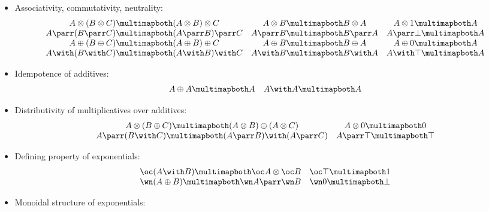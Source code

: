 \begin{itemize}
\item
  Associativity, commutativity, neutrality:
  \begin{equation*}
    \begin{array}{ccc}
    A \tens (B \tens C) \linequiv (A \tens B) \tens C & A \tens B \linequiv B \tens A & A \tens \one \linequiv A \\
    A \parr (B \parr C) \linequiv (A \parr B) \parr C & A \parr B \linequiv B \parr A & A \parr \bot \linequiv A \\
    A \plus (B \plus C) \linequiv (A \plus B) \plus C & A \plus B \linequiv B \plus A & A \plus \zero \linequiv A \\
A \with (B \with C) \linequiv (A \with B) \with C & A \with B \linequiv B \with A & A \with \top \linequiv A
    \end{array}
  \end{equation*}
\item
  Idempotence of additives:
  \begin{equation*}
    \begin{array}{cc}
      A \plus A \linequiv A & A \with A \linequiv A
    \end{array}
  \end{equation*}
\item
  Distributivity of multiplicatives over additives:
  \begin{equation*}
    \begin{array}{cc}
       A \tens (B \plus C) \linequiv (A \tens B) \plus (A \tens C) & A \tens \zero \linequiv \zero \\
       A \parr (B \with C) \linequiv (A \parr B) \with (A \parr C) & A \parr \top \linequiv \top
    \end{array}
  \end{equation*}
\item
  Defining property of exponentials:
  \begin{equation*}
    \begin{array}{cc}
       \oc(A \with B) \linequiv \oc A \tens \oc B & \oc\top \linequiv \one \\
       \wn(A \plus B) \linequiv \wn A \parr \wn B & \wn\zero \linequiv \bot
    \end{array}
  \end{equation*}
\item
  Monoidal structure of exponentials:
  \begin{equation*}
    \begin{array}{cc}

\end{array}
\end{equation*}
\end{itemize}
